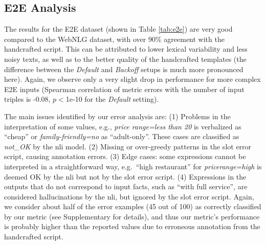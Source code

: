 \subsection{E2E Analysis}
\label{sec:e2e-results}




The results for the E2E dataset (shown in Table \ref{tab:e2e}) are very good compared to the WebNLG dataset, with over 90\% agreement with the handcrafted script. This can be attributed to lower lexical variability and less noisy texts, as well as to the better quality of the handcrafted templates (the difference between the \emph{Default} and \emph{Backoff} setups is much more pronounced here).
Again, we observe only a very slight drop in performance for more complex E2E inputs (Spearman correlation of metric errors with the number of input triples is -0.08, $p<$1e-10 for the \emph{Default} setting).

The main issues identified by our error analysis are:
(1) Problems in the interpretation of some values, e.g., \textit{price range=less than \textsterling{}20} is verbalized as ``cheap'' or \textit{family-friendly=no} as ``adult-only''. These cases are classified as \emph{not\_OK} by the \ac{nli} model.
(2) Missing or over-greedy patterns in the slot error script, causing annotation errors.
(3) Edge cases: some expressions cannot be interpreted in a straightforward way, e.g.\ ``high restaurant'' for \emph{pricerange=high} is deemed OK by the \ac{nli} but not by the slot error script.
(4) Expressions in the outputs that do not correspond to input facts, such as ``with full service'', are considered hallucinations by the \ac{nli}, but ignored by the slot error script.
Again, we consider about half of the error examples (45 out of 100) as correctly classified by our metric (see Supplementary for details), and thus our metric's performance is probably higher than the reported values due to erroneous annotation from the handcrafted script.

